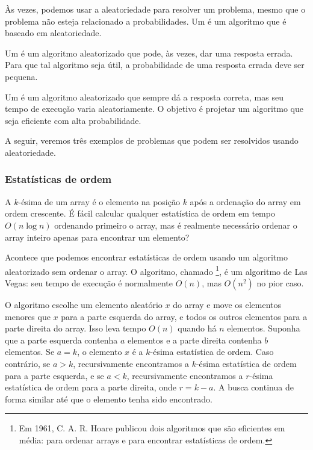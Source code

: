 Às vezes, podemos usar a aleatoriedade para resolver um problema,
mesmo que o problema não esteja relacionado a probabilidades.
Um  é um algoritmo que
é baseado em aleatoriedade.


Um  é um algoritmo aleatorizado
que pode, às vezes, dar uma resposta errada.
Para que tal algoritmo seja útil,
a probabilidade de uma resposta errada deve ser pequena.


Um  é um algoritmo aleatorizado
que sempre dá a resposta correta,
mas seu tempo de execução varia aleatoriamente.
O objetivo é projetar um algoritmo que seja
eficiente com alta probabilidade.

A seguir, veremos três exemplos de problemas que
podem ser resolvidos usando aleatoriedade.

\subsubsection{Estatísticas de ordem}


A $k$-ésima  de um array
é o elemento na posição $k$ após a ordenação
do array em ordem crescente.
É fácil calcular qualquer estatística de ordem
em tempo $O(n \log n)$ ordenando primeiro o array,
mas é realmente necessário ordenar o array inteiro
apenas para encontrar um elemento?

Acontece que podemos encontrar estatísticas de ordem
usando um algoritmo aleatorizado sem ordenar o array.
O algoritmo, chamado \footnote{Em 1961,
C. A. R. Hoare publicou dois algoritmos que
são eficientes em média:  
 \cite{hoa61a} para ordenar arrays e
 \cite{hoa61b} para encontrar estatísticas de ordem.}, é um algoritmo de Las Vegas:
seu tempo de execução é normalmente $O(n)$,
mas $O(n^2)$ no pior caso.

O algoritmo escolhe um elemento aleatório $x$
do array e move os elementos menores que $x$
para a parte esquerda do array,
e todos os outros elementos para a parte direita do array.
Isso leva tempo $O(n)$ quando há $n$ elementos.
Suponha que a parte esquerda contenha $a$ elementos
e a parte direita contenha $b$ elementos.
Se $a=k$, o elemento $x$ é a $k$-ésima estatística de ordem.
Caso contrário, se $a>k$, recursivamente encontramos a $k$-ésima estatística de ordem
para a parte esquerda,
e se $a<k$, recursivamente encontramos a $r$-ésima estatística de ordem
para a parte direita, onde $r=k-a$.
A busca continua de forma similar até que o elemento
tenha sido encontrado.


